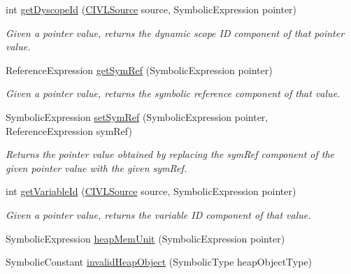 \begin{DoxyCompactItemize}
\item 
int \hyperlink{classedu_1_1udel_1_1cis_1_1vsl_1_1civl_1_1dynamic_1_1common_1_1CommonSymbolicUtility_a71e8fa510b3896769626e05b7ebf4a9f}{get\+Dyscope\+Id} (\hyperlink{interfaceedu_1_1udel_1_1cis_1_1vsl_1_1civl_1_1model_1_1IF_1_1CIVLSource}{C\+I\+V\+L\+Source} source, Symbolic\+Expression pointer)
\begin{DoxyCompactList}\small\item\em Given a pointer value, returns the dynamic scope I\+D component of that pointer value. \end{DoxyCompactList}\item 
Reference\+Expression \hyperlink{classedu_1_1udel_1_1cis_1_1vsl_1_1civl_1_1dynamic_1_1common_1_1CommonSymbolicUtility_a7865dd8888c58af0b4b29a3bc97814e4}{get\+Sym\+Ref} (Symbolic\+Expression pointer)
\begin{DoxyCompactList}\small\item\em Given a pointer value, returns the symbolic reference component of that value. \end{DoxyCompactList}\item 
Symbolic\+Expression \hyperlink{classedu_1_1udel_1_1cis_1_1vsl_1_1civl_1_1dynamic_1_1common_1_1CommonSymbolicUtility_a82ec7455e2a593bef497ef2b80823a47}{set\+Sym\+Ref} (Symbolic\+Expression pointer, Reference\+Expression sym\+Ref)
\begin{DoxyCompactList}\small\item\em Returns the pointer value obtained by replacing the sym\+Ref component of the given pointer value with the given sym\+Ref. \end{DoxyCompactList}\item 
int \hyperlink{classedu_1_1udel_1_1cis_1_1vsl_1_1civl_1_1dynamic_1_1common_1_1CommonSymbolicUtility_abcedc27b1959d8c107b6056044b24ea3}{get\+Variable\+Id} (\hyperlink{interfaceedu_1_1udel_1_1cis_1_1vsl_1_1civl_1_1model_1_1IF_1_1CIVLSource}{C\+I\+V\+L\+Source} source, Symbolic\+Expression pointer)
\begin{DoxyCompactList}\small\item\em Given a pointer value, returns the variable I\+D component of that value. \end{DoxyCompactList}\item 
Symbolic\+Expression \hyperlink{classedu_1_1udel_1_1cis_1_1vsl_1_1civl_1_1dynamic_1_1common_1_1CommonSymbolicUtility_a76acc1653d7756ec7c8a772216e455f3}{heap\+Mem\+Unit} (Symbolic\+Expression pointer)
\item 
Symbolic\+Constant \hyperlink{classedu_1_1udel_1_1cis_1_1vsl_1_1civl_1_1dynamic_1_1common_1_1CommonSymbolicUtility_a1bc5a8274ff55136072607a26c5563ea}{invalid\+Heap\+Object} (Symbolic\+Type heap\+Object\+Type)

\end{DoxyCompactItemize}
